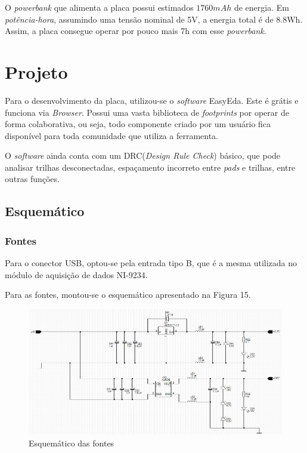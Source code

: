 \documentclass[
	12pt,				%
	openright,			%
	twoside,			%
	a4paper,			%
	english,			%
	french,				%
	spanish,			%
	brazil,				%
	]{abntex2}
\begin{document}
			O \textit{powerbank} que alimenta a placa possui estimados $1760mAh$ de
			energia. Em \textit{potência-hora}, assumindo uma tensão nominal
			de 5V, a energia total é de 8.8Wh. Assim, a placa consegue operar
			por pouco mais 7h com esse \textit{powerbank}.

	\section{Projeto}
		Para o desenvolvimento da placa, utilizou-se o \textit{software}
		EasyEda. Este é grátis e funciona via \textit{Browser}. Possui uma
		vasta biblioteca de \textit{footprints} por operar de forma
		colaborativa, ou seja, todo componente criado por um usuário fica
		disponível para toda comunidade que utiliza a ferramenta.

		O \textit{software} ainda conta com um DRC(\textit{Design Rule
		Check}) básico, que pode analisar trilhas desconectadas, espaçamento
		incorreto entre \textit{pads} e trilhas, entre outras funções.
		\subsection{Esquemático}
			\subsubsection{Fontes}
				Para o conector USB, optou-se pela entrada tipo B, que é a
				mesma utilizada no módulo de aquisição de dados NI-9234.

				Para as fontes, montou-se o esquemático apresentado na Figura 15.

				\begin{figure}[!ht]
					\centering
					\includegraphics[width=\linewidth]{../Fotos/fonte.jpg}
					\caption{Esquemático das fontes}
				\end{figure}
\end{document}
